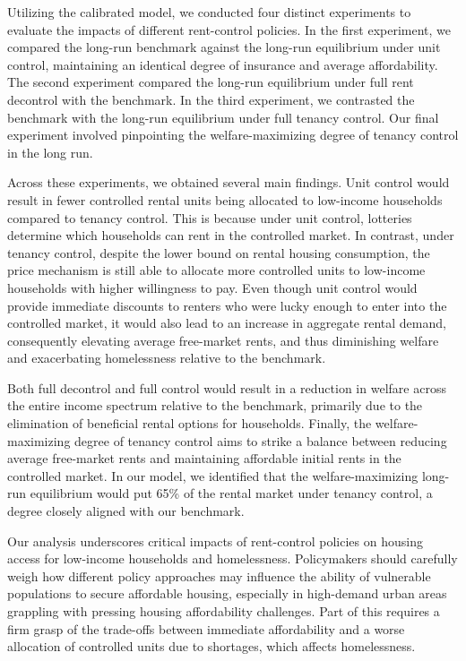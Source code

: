 \documentclass[parskip=full]{article}
\begin{document}
Utilizing the calibrated model, we conducted four distinct experiments to evaluate the impacts of different rent-control policies. In the first experiment, we compared the long-run benchmark against the long-run equilibrium under unit control, maintaining an identical degree of insurance and average affordability. The second experiment compared the long-run equilibrium under full rent decontrol with the benchmark. In the third experiment, we contrasted the benchmark with the long-run equilibrium under full tenancy control. Our final experiment involved pinpointing the welfare-maximizing degree of tenancy control in the long run.

Across these experiments, we obtained several main findings. Unit control would result in fewer controlled rental units being allocated to low-income households compared to tenancy control. This is because under unit control, lotteries determine which households can rent in the controlled market. In contrast, under tenancy control, despite the lower bound on rental housing consumption, the price mechanism is still able to allocate more controlled units to low-income households with higher willingness to pay. Even though unit control would provide immediate discounts to renters who were lucky enough to enter into the controlled market, it would also lead to an increase in aggregate rental demand, consequently elevating average free-market rents, and thus diminishing welfare and exacerbating homelessness relative to the benchmark. 

Both full decontrol and full control would result in a reduction in welfare across the entire income spectrum relative to the benchmark, primarily due to the elimination of beneficial rental options for households. Finally, the welfare-maximizing degree of tenancy control aims to strike a balance between reducing average free-market rents and maintaining affordable initial rents in the controlled market. In our model, we identified that the welfare-maximizing long-run equilibrium would put 65\% of the rental market under tenancy control, a degree closely aligned with our benchmark.

Our analysis underscores critical impacts of rent-control policies on housing access for low-income households and homelessness. Policymakers should carefully weigh how different policy approaches may influence the ability of vulnerable populations to secure affordable housing, especially in high-demand urban areas grappling with pressing housing affordability challenges. Part of this requires a firm grasp of the trade-offs between immediate affordability and a worse allocation of controlled units due to shortages, which affects homelessness.
\end{document}
